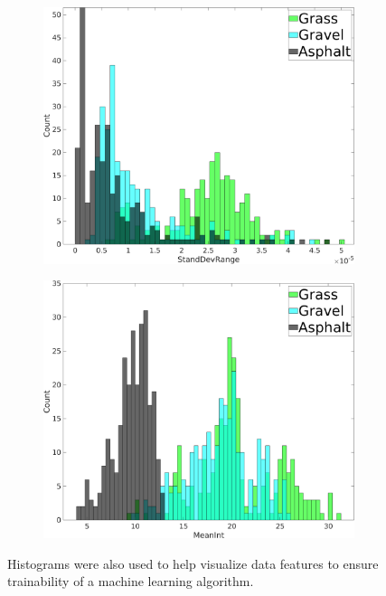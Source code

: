 \documentclass[numbered,pdftex]{ohio-etd}
\begin{document}
{{		\begin{figure}[H]
			\centering
			\begin{subfigure}{0.45\textwidth}
				\centering
				\includegraphics[width=1.0\linewidth]{Defense_Images/Ransac_Histogram_example_1}
				\caption[Feature Histogram Example 1]{}
				\label{fig:Ransac_Histogram_example_1}
			\end{subfigure}
			\begin{subfigure}{0.45\textwidth}
				\centering
				\includegraphics[width=1.0\linewidth]{Defense_Images/Ransac_Histogram_example_2}
				\caption[Feature Histogram Example 2]{}
				\label{fig:Ransac_Histogram_example_2}
			\end{subfigure}
			\caption[Feature Histograms]{Histograms were also used to help visualize data features to ensure trainability of a machine learning algorithm.}
			\label{fig:ransac_two_histograms}
		\end{figure}
		
}}
\end{document}
